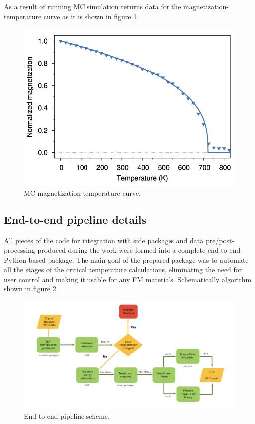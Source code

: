 As a result of running MC simulation returns data for the magnetization-temperature curve as it is shown in figure \ref{fig:mt_curve}.  

\begin{figure}[H]
\centering
\captionsetup{justification=centering,margin=2cm}
\includegraphics[width=120mm]{fig/dft_fig/mt_curve.png}
\caption[MC magnetization temperature curve.]{MC magnetization temperature curve.}
\label{fig:mt_curve}
\end{figure}

\subsection{End-to-end pipeline details} 
All pieces of the code for integration with side packages and data pre/post-processing produced during the work were formed into a complete end-to-end Python-based package. The main goal of the prepared package was to automate all the stages of the critical temperature calculations, eliminating the need for user control and making it usable for any FM materials. Schematically algorithm shown in figure \ref{fig:End-to-end pipeline scheme}.

\begin{figure}[H]
\centering
\captionsetup{justification=centering,margin=2cm}
	\includegraphics[width=160mm]{fig/dft_fig/algo.png}
	\caption[End-to-end pipeline scheme.]{End-to-end pipeline scheme.}
\label{fig:End-to-end pipeline scheme}
\end{figure}

